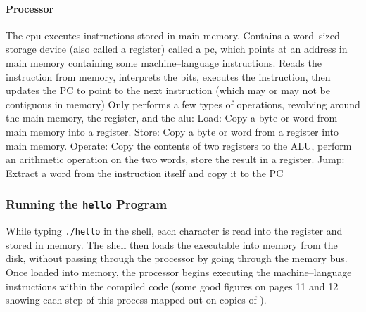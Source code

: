 \documentclass[../bryant_comp_sys.tex]{subfiles}
\begin{document}
            \paragraph{Processor}
                \begin{outline}
                    \1 The \gls{cpu} executes instructions stored in main memory.
                    \1 Contains a \gls{word}--sized storage device (also called a register) called a \gls{pc}, which points at an address in main memory containing some machine--language instructions.
                    \1 Reads the instruction from memory, interprets the bits, executes the instruction, then updates the PC to point to the next instruction (which may or may not be contiguous in memory)
                    \1 Only performs a few types of operations, revolving around the main memory, the \gls{register}, and the \gls{alu}:
                        \2 Load: Copy a byte or word from main memory into a register.
                        \2 Store: Copy a byte or word from a register into main memory.
                        \2 Operate: Copy the contents of two registers to the ALU, perform an arithmetic operation on the two words, store the result in a register.
                        \2 Jump: Extract a word from the instruction itself and copy it to the PC
                \end{outline}
        
        \subsubsection{Running the \texttt{hello} Program} \label{sec:runProgram}
            \begin{outline}
                \1 While typing \texttt{./hello} in the shell, each character is read into the register and stored in memory.
                \1 The shell then loads the executable into memory from the disk, without passing through the processor by going through the memory bus.
                \1 Once loaded into memory, the processor begins executing the machine--language instructions within the compiled code (some good figures on pages 11 and 12 showing each step of this process mapped out on copies of ).
            \end{outline}
\end{document}
